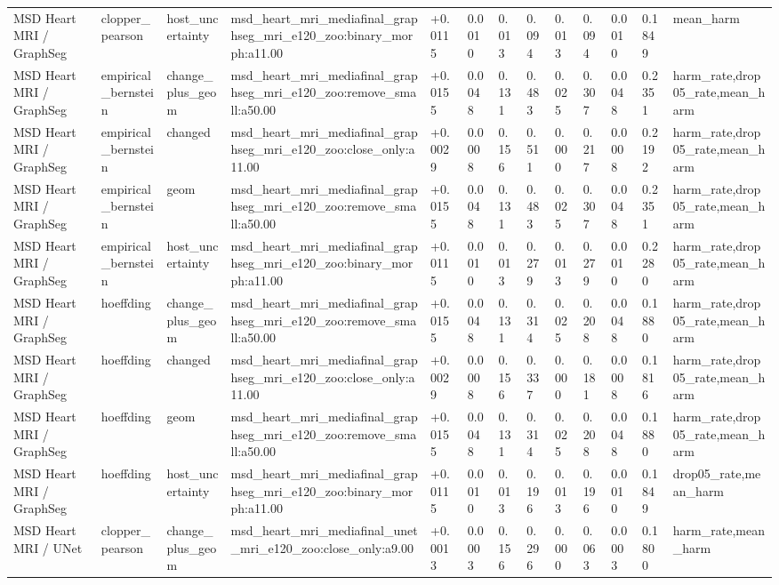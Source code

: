 \begin{table}[t]
\begin{tabular}{lllllllllllll}
MSD Heart MRI / GraphSeg & clopper\_pearson & host\_uncertainty & msd\_heart\_mri\_mediafinal\_graphseg\_mri\_e120\_zoo:binary\_morph:a11.00 & +0.0115 & 0.0010 & 0.013 & 0.094 & 0.013 & 0.094 & 0.0010 & 0.1849 & mean\_harm \\
MSD Heart MRI / GraphSeg & empirical\_bernstein & change\_plus\_geom & msd\_heart\_mri\_mediafinal\_graphseg\_mri\_e120\_zoo:remove\_small:a50.00 & +0.0155 & 0.0048 & 0.131 & 0.483 & 0.025 & 0.307 & 0.0048 & 0.2351 & harm\_rate,drop05\_rate,mean\_harm \\
MSD Heart MRI / GraphSeg & empirical\_bernstein & changed & msd\_heart\_mri\_mediafinal\_graphseg\_mri\_e120\_zoo:close\_only:a11.00 & +0.0029 & 0.0008 & 0.156 & 0.511 & 0.000 & 0.217 & 0.0008 & 0.2192 & harm\_rate,drop05\_rate,mean\_harm \\
MSD Heart MRI / GraphSeg & empirical\_bernstein & geom & msd\_heart\_mri\_mediafinal\_graphseg\_mri\_e120\_zoo:remove\_small:a50.00 & +0.0155 & 0.0048 & 0.131 & 0.483 & 0.025 & 0.307 & 0.0048 & 0.2351 & harm\_rate,drop05\_rate,mean\_harm \\
MSD Heart MRI / GraphSeg & empirical\_bernstein & host\_uncertainty & msd\_heart\_mri\_mediafinal\_graphseg\_mri\_e120\_zoo:binary\_morph:a11.00 & +0.0115 & 0.0010 & 0.013 & 0.279 & 0.013 & 0.279 & 0.0010 & 0.2280 & harm\_rate,drop05\_rate,mean\_harm \\
MSD Heart MRI / GraphSeg & hoeffding & change\_plus\_geom & msd\_heart\_mri\_mediafinal\_graphseg\_mri\_e120\_zoo:remove\_small:a50.00 & +0.0155 & 0.0048 & 0.131 & 0.314 & 0.025 & 0.208 & 0.0048 & 0.1880 & harm\_rate,drop05\_rate,mean\_harm \\
MSD Heart MRI / GraphSeg & hoeffding & changed & msd\_heart\_mri\_mediafinal\_graphseg\_mri\_e120\_zoo:close\_only:a11.00 & +0.0029 & 0.0008 & 0.156 & 0.337 & 0.000 & 0.181 & 0.0008 & 0.1816 & harm\_rate,drop05\_rate,mean\_harm \\
MSD Heart MRI / GraphSeg & hoeffding & geom & msd\_heart\_mri\_mediafinal\_graphseg\_mri\_e120\_zoo:remove\_small:a50.00 & +0.0155 & 0.0048 & 0.131 & 0.314 & 0.025 & 0.208 & 0.0048 & 0.1880 & harm\_rate,drop05\_rate,mean\_harm \\
MSD Heart MRI / GraphSeg & hoeffding & host\_uncertainty & msd\_heart\_mri\_mediafinal\_graphseg\_mri\_e120\_zoo:binary\_morph:a11.00 & +0.0115 & 0.0010 & 0.013 & 0.196 & 0.013 & 0.196 & 0.0010 & 0.1849 & drop05\_rate,mean\_harm \\
MSD Heart MRI / UNet & clopper\_pearson & change\_plus\_geom & msd\_heart\_mri\_mediafinal\_unet\_mri\_e120\_zoo:close\_only:a9.00 & +0.0013 & 0.0003 & 0.156 & 0.296 & 0.000 & 0.063 & 0.0003 & 0.1800 & harm\_rate,mean\_harm \\

\end{tabular}
\end{table}
